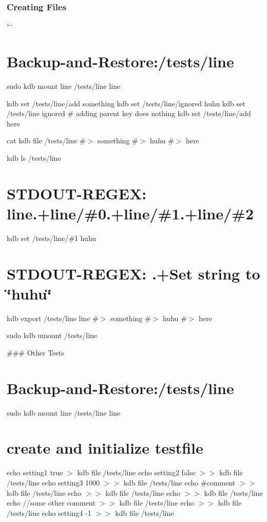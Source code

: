 \subsubsection*{Creating Files}

``` \section*{Backup-\/and-\/\+Restore\+:/tests/line}

sudo kdb mount line /tests/line line

kdb set /tests/line/add something kdb set /tests/line/ignored huhu kdb set /tests/line ignored \# adding parent key does nothing kdb set /tests/line/add here

cat {\ttfamily kdb file /tests/line} \#$>$ something \#$>$ huhu \#$>$ here

kdb ls /tests/line \section*{S\+T\+D\+O\+U\+T-\/\+R\+E\+G\+EX\+: line.+line/\#0.+line/\#1.+line/\#2}

kdb set /tests/line/\#1 huhu \section*{S\+T\+D\+O\+U\+T-\/\+R\+E\+G\+EX\+: .+\+Set string to \char`\"{}huhu\char`\"{}}

kdb export /tests/line line \#$>$ something \#$>$ huhu \#$>$ here

sudo kdb umount /tests/line 
\begin{DoxyCode}
### Other Tests
\end{DoxyCode}
 \section*{Backup-\/and-\/\+Restore\+:/tests/line}

sudo kdb mount line /tests/line line

\section*{create and initialize testfile}

echo \textquotesingle{}setting1 true\textquotesingle{} $>$ {\ttfamily kdb file /tests/line} echo \textquotesingle{}setting2 false\textquotesingle{} $>$$>$ {\ttfamily kdb file /tests/line} echo \textquotesingle{}setting3 1000\textquotesingle{} $>$$>$ {\ttfamily kdb file /tests/line} echo \textquotesingle{}\#comment\textquotesingle{} $>$$>$ {\ttfamily kdb file /tests/line} echo $>$$>$ {\ttfamily kdb file /tests/line} echo $>$$>$ {\ttfamily kdb file /tests/line} echo \textquotesingle{}//some other comment\textquotesingle{} $>$$>$ {\ttfamily kdb file /tests/line} echo $>$$>$ {\ttfamily kdb file /tests/line} echo \textquotesingle{}setting4 -\/1\textquotesingle{} $>$$>$ {\ttfamily kdb file /tests/line}

